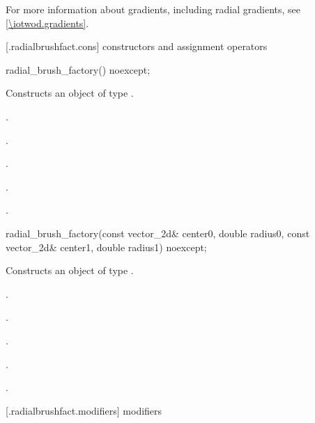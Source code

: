 \pnum
For more information about gradients, including radial gradients, see \ref{\iotwod.gradients}.

 [\iotwod.radialbrushfact.cons] { constructors and assignment operators}

\begin{itemdecl}
    radial_brush_factory() noexcept;
\end{itemdecl}
\begin{itemdescr}
	\pnum
	\effects
	Constructs an object of type .
	
	\pnum
	\postconditions
	.

	\pnum
	.

	\pnum
	.
	
	\pnum
	.

	\pnum
	.
	
\end{itemdescr}

\begin{itemdecl}
    radial_brush_factory(const vector_2d& center0, double radius0,
      const vector_2d& center1, double radius1) noexcept;
\end{itemdecl}
\begin{itemdescr}
	\pnum
	\effects
	Constructs an object of type .
	
	\pnum
	\postconditions
	.

	\pnum
	.

	\pnum
	.
	
	\pnum
	.

	\pnum
	.
	
\end{itemdescr}

 [\iotwod.radialbrushfact.modifiers] { modifiers}


